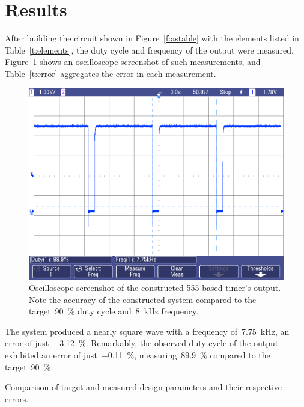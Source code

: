 \section{Results}

After building the circuit shown in Figure~\ref{f:astable} with the elements
listed in Table~\ref{t:elements}, the duty cycle and frequency of the output
were measured.  Figure~\ref{f:scope} shows an oscilloscope screenshot of such
measurements, and Table~\ref{t:error} aggregates the error in each
measurement.
%
\begin{figure}[H]
\centering
	\includegraphics[width=.8\textwidth]{img/shot/555_output.png}
	\parbox{.8\textwidth}{
	\caption[Measured Results]{Oscilloscope screenshot of the constructed
	555-based timer's output.  Note the accuracy of the constructed system
	compared to the target~\SI{90}{\percent} duty cycle and~\SI{8}{\kilo\hertz}
	frequency.}
	\label{f:scope}}
\end{figure}
%
The system produced a nearly square wave with a frequency
of~\SI{7.75}{\kilo\hertz}, an error of just~\SI{-3.12}{\percent}.  Remarkably,
the observed duty cycle of the output exhibited an error of
just~\SI{-0.11}{\percent}, measuring~\SI{89.9}{\percent} compared to the
target~\SI{90}{\percent}.
%
\begin{table}[H]
\centering
	\parbox{.5\textwidth}{
	\caption[Measured Error]{Comparison of target and measured design
	parameters and their respective errors.}
	\label{t:error}}\\
	
\end{table}
